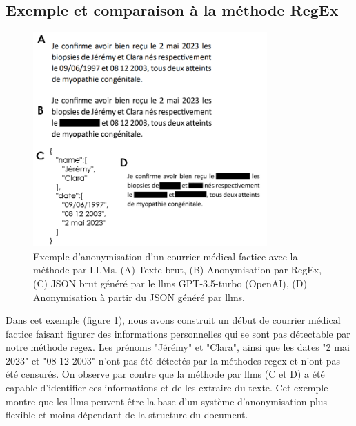 \subsection{Exemple et comparaison à la méthode RegEx}
\begin{figure}[htbp]
 \centering
 \includegraphics[width=0.8\textwidth]{figures/llms_anonym.png}
 \caption[Exemple anonymisation LLMs]{Exemple d'anonymisation d'un courrier médical factice avec la méthode par LLMs. (A) Texte brut, (B) Anonymisation par RegEx, (C) JSON brut généré par le \gls{llms} GPT-3.5-turbo (OpenAI), (D) Anonymisation à partir du JSON généré par \gls{llms}.}
 \label{fig:llms_anonym}
\end{figure}

Dans cet exemple (figure \ref{fig:llms_anonym}), nous avons construit un début de courrier médical factice faisant figurer des informations personnelles qui se sont pas détectable par notre méthode \gls{regex}. Les prénoms "Jérémy" et "Clara", ainsi que les dates "2 mai 2023" et "08 12 2003" n'ont pas été détectés par la méthodes \gls{regex} et n'ont pas été censurés. On observe par contre que la méthode par \gls{llms} (C et D) a été capable d'identifier ces informations et de les extraire du texte. Cet exemple montre que les \gls{llms} peuvent être la base d'un système d'anonymisation plus flexible et moins dépendant de la structure du document.


